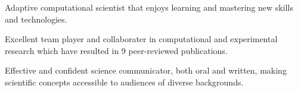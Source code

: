 

\begin{cventries}
\vspace{-4.0mm}

  \cventry
    {} %
    {} %
    {} %
    {} %
    {
      \begin{cvitems} %
        \item {Adaptive computational scientist that enjoys learning and mastering new skills and technologies.}
        \vspace{1.0mm}
        \item {Excellent team player and collaborater in computational and experimental research which have resulted in 9 peer-reviewed publications.}
        \vspace{1.0mm}
        \item {Effective and confident science communicator, both oral and written, making scientific concepts accessible to audiences of diverse backgrounds.}
      \end{cvitems}
    }
\vspace{-4.0mm}
\end{cventries}
